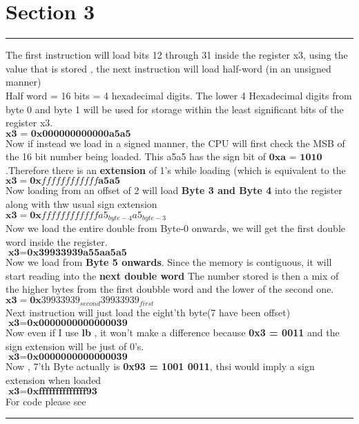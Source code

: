 \section{Section 3}
\vspace{5pt}
\hrule
\vspace{5pt}
The first instruction will load bits 12 through 31 inside the register x3, using the
value that is stored ,
the next instruction will load half-word (in an unsigned manner)
\\
Half word  = 16 bits  = 4 hexadecimal digits.
The lower 4 Hexadecimal digits from byte 0 and byte 1 will be used for storage within the least significant bits
of the register x3.
\\
$\textbf{x3 = 0x000000000000a5a5} $
\\
Now if instead we load in a signed manner, the CPU will first check the MSB 
of the 16 bit number being loaded. This a5a5 has the sign bit of $\textbf{0xa = 1010}$
.Therefore there is an \textbf{extension} of 1's while loading (which is equivalent to the 
$\textbf{x3} = \textbf{0x}ffffffffffff\textbf{a5a5}$
\\
Now loading from  an offset of 2 will load \textbf{Byte 3 and Byte 4} into the register along with thw usual sign extension
\\
$\textbf{x3} = \textbf{0x}ffffffffffff\textbf{$a5_{byte-4}a5_{byte-3}$}$
\\
Now we load the entire double from Byte-0 onwards, we will get the first double word inside
the register.
\\
$\textbf{x3} = \textbf{0x39933939a55aa5a5}$
\\
Now we load from \textbf{Byte 5 onwards}. Since the memory is contiguous, it will start reading into the \textbf{next double word}
The number stored is then a mix of the higher bytes from the first doubble word and the lower of the second one.
$\textbf{x3} = \textbf{0x$39933939_{second} 39933939_{first}$}$
\\
Next instruction will just load the eight'th byte(7 have been offset)
\\
$\textbf{x3} = \textbf{0x0000000000000039}$
\\
Now even if I use \textbf{lb} , it won't make a difference because \textbf{0x3 = 0011} and the sign extension 
will be just of 0's.\\
$\textbf{x3} = \textbf{0x0000000000000039}$
\\
Now , 7'th Byte actually is \textbf{0x93 = 1001 0011}, thsi would imply a sign extension when loaded
\\
$\textbf{x3} = \textbf{0xffffffffffffff93}$
\\
For code please see \cite{CS2323}
\vspace{5pt}
\hrule
